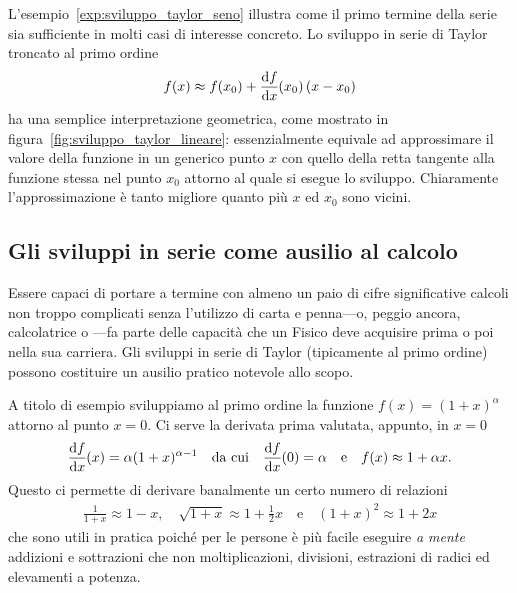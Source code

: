 L'esempio~\ref{exp:sviluppo_taylor_seno} illustra come il primo termine della
serie sia sufficiente in molti casi di interesse concreto. Lo
sviluppo in serie di Taylor troncato al primo ordine
\begin{align}\label{eq:sviluppo_taylor_lineare}
  f(x) \approx f(x_0) + \td{f}{x}{x_0} (x - x_0)
\end{align}
ha una semplice interpretazione geometrica, come mostrato in
figura~\ref{fig:sviluppo_taylor_lineare}: essenzialmente equivale ad
approssimare il valore della funzione in un generico punto $x$ con quello della
retta tangente alla funzione stessa nel punto $x_0$ attorno al quale si esegue
lo sviluppo. Chiaramente l'approssimazione è tanto migliore quanto più $x$
ed $x_0$ sono vicini.



\subsection{Gli sviluppi in serie come ausilio al calcolo}

Essere capaci di portare a termine con almeno un paio di cifre significative
calcoli non troppo complicati senza l'utilizzo di carta e penna---o, peggio
ancora, calcolatrice o ---fa parte delle capacità che
un Fisico deve acquisire prima o poi nella sua carriera. Gli sviluppi in serie
di Taylor (tipicamente al primo ordine) possono costituire un ausilio pratico
notevole allo scopo.

A titolo di esempio sviluppiamo al primo ordine la funzione
$f(x) = (1 + x)^\alpha$ attorno al punto $x = 0$. Ci serve la derivata prima
valutata, appunto, in $x = 0$
\begin{align}
  \td{f}{x}{x} = \alpha (1 + x)^{\alpha - 1} \quad \text{da cui} \quad
  \td{f}{x}{0} = \alpha \quad \text{e} \quad
  f(x) \approx 1 + \alpha x.
\end{align}
Questo ci permette di derivare banalmente un certo numero di relazioni
\begin{align}
  \frac{1}{1 + x} \approx 1 - x, \quad
  \sqrt{1 + x} \approx 1 + \frac{1}{2}x \quad \text{e} \quad
  (1 + x)^2 \approx 1 + 2x
\end{align}
che sono utili in pratica poiché per le persone è più facile eseguire
\emph{a mente} addizioni e sottrazioni che non moltiplicazioni, divisioni,
estrazioni di radici ed elevamenti a potenza.

